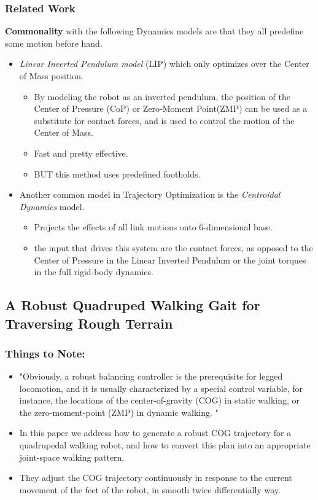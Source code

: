 \documentclass{article}
\theoremstyle{definition}
\theoremstyle{note}
\begin{document}
\subsubsection{Related Work}
\textbf{Commonality} with the following Dynamics models are that they all predefine some motion before hand.
\begin{itemize}
    \item \textit{Linear Inverted Pendulum model} (LIP) which only optimizes over the Center of Mass position.
    \begin{itemize}
        \item By modeling the robot as an inverted pendulum, the position of the Center of Pressure (CoP) or Zero-Moment Point(ZMP) can
        be used as a substitute for contact forces, and is used to control the motion of the Center of Mass. 
        \item Fast and pretty effective.
        \item BUT this method uses predefined footholds.
    \end{itemize}
    \item Another common model in Trajectory Optimization is the \textit{Centroidal Dynamics} model.
    \begin{itemize}
        \item Projects the effects of all link motions onto 6-dimensional base. 
        \item the input that drives this system are the contact forces, as opposed to the Center of Pressure in the Linear Inverted Pendulum or the 
        joint torques in the full rigid-body dynamics.
    \end{itemize}
\end{itemize}


\subsection{A Robust Quadruped Walking Gait for Traversing Rough Terrain}
\subsubsection{Things to Note:}
\begin{itemize}
\item "Obviously, a robust balancing  controller  is  the  prerequisite  for  legged  locomotion,  and it is usually characterized by a special control variable, for instance, the locations of the center-of-gravity (COG) in static walking, or the zero-moment-point (ZMP) in dynamic walking. "
\item In this paper  we  address  how  to  generate  a  robust  COG  trajectory  for  a  quadrupedal  walking  robot,  and  how  to  convert  this plan  into  an  appropriate  joint-space  walking  pattern.
\item They adjust the COG trajectory continuously in response to the current movement of the feet of the robot, in smooth twice differentially way.
\end{itemize}
\end{document}
